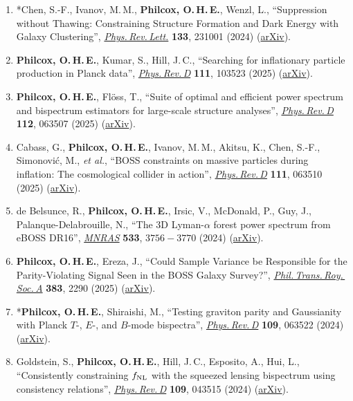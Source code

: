 \begin{enumerate}
    \item *Chen, S.-F., Ivanov, M.\,M., \textbf{Philcox, O.\,H.\,E.}, Wenzl, L., ``Suppression without Thawing: Constraining Structure Formation and Dark Energy with Galaxy Clustering'', \href{https://doi.org/10.1103/PhysRevLett.133.231001}{\textit{Phys.\,Rev.\,Lett.}} \textbf{133}, 231001 (2024) (\href{https://arxiv.org/abs/2406.13388}{arXiv}).
    \item \textbf{Philcox, O.\,H.\,E.}, Kumar, S., Hill, J.\,C., ``Searching for inflationary particle production in Planck data'', \href{https://doi.org/10.1103/PhysRevD.111.103523}{\textit{Phys.\,Rev.\,D}} \textbf{111}, 103523 (2025) (\href{https://arxiv.org/abs/2405.03738}{arXiv}).
    \item \textbf{Philcox, O.\,H.\,E.}, Fl\"oss, T., ``Suite of optimal and efficient power spectrum and bispectrum estimators for large-scale structure analyses'', \href{https://doi.org/10.1103/rr6c-cf3s}{\textit{Phys.\,Rev.\,D}} \textbf{112}, 063507 (2025) (\href{https://arxiv.org/abs/2404.07249}{arXiv}).
    \item Cabass, G., \textbf{Philcox, O.\,H.\,E.}, Ivanov, M.\,M., Akitsu, K., Chen, S.-F., Simonovi\'c, M., \textit{et al.}, ``BOSS constraints on massive particles during inflation: The cosmological collider in action'', \href{https://doi.org/10.1103/PhysRevD.111.063510}{\textit{Phys.\,Rev.\,D}} \textbf{111}, 063510 (2025) (\href{https://arxiv.org/abs/2404.01894}{arXiv}).
    \item de Belsunce, R., \textbf{Philcox, O.\,H.\,E.}, Irsic, V., McDonald, P., Guy, J., Palanque-Delabrouille, N., ``The 3D Lyman-$\alpha$ forest power spectrum from eBOSS DR16'', \href{https://doi.org/10.1093/mnras/stae2035}{\textit{MNRAS}} \textbf{533}, $3756-3770$ (2024) (\href{https://arxiv.org/abs/2403.08241}{arXiv}).
    \item \textbf{Philcox, O.\,H.\,E.}, Ereza, J., ``Could Sample Variance be Responsible for the Parity-Violating Signal Seen in the BOSS Galaxy Survey?'', \href{https://doi.org/10.1098/rsta.2024.0034}{\textit{Phil.\,Trans.\,Roy.\,Soc.\,A}} \textbf{383}, 2290 (2025) (\href{https://arxiv.org/abs/2401.09523}{arXiv}).
    \item *\textbf{Philcox, O.\,H.\,E.}, Shiraishi, M., ``Testing graviton parity and Gaussianity with Planck $T$-, $E$-, and $B$-mode bispectra'', \href{https://doi.org/10.1103/PhysRevD.109.063522}{\textit{Phys.\,Rev.\,D}} \textbf{109}, 063522 (2024) (\href{https://arxiv.org/abs/2312.12498}{arXiv}).
    \item Goldstein, S., \textbf{Philcox, O.\,H.\,E.}, Hill, J.\,C., Esposito, A., Hui, L., ``Consistently constraining $f_{\rm NL}$ with the squeezed lensing bispectrum using consistency relations'', \href{https://doi.org/10.1103/PhysRevD.109.043515}{\textit{Phys.\,Rev.\,D}} \textbf{109}, 043515 (2024) (\href{https://arxiv.org/abs/2310.12959}{arXiv}).

\end{enumerate}

